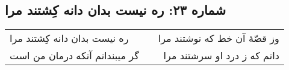 \begin{center}
\section*{شماره ۲۳: ره نیست بدان دانه کِشتند مرا}
\label{sec:023}
\begin{longtable}{l p{0.5cm} r}
ره نیست بدان دانه کِشتند مرا
&&
وز قصّهٔ آن خط که نوشتند مرا
\\
گر میبندانم آنکه درمان من است
&&
دانم که ز درد او سرشتند مرا
\\
\end{longtable}
\end{center}
